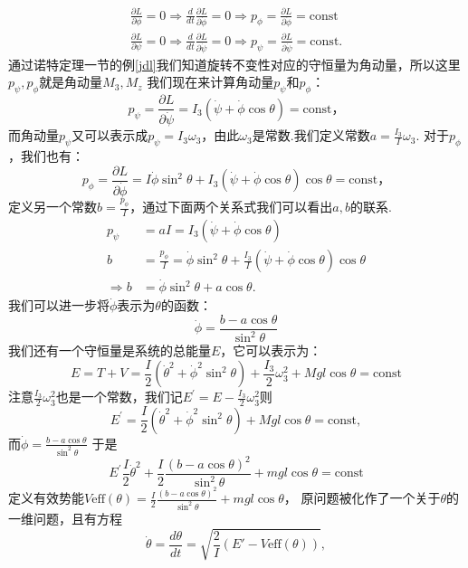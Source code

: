\documentclass[UTF8,10.5pt,a4paper]{ctexart}
\numberwithin{equation}{section}
\theoremstyle{definition}
\theoremstyle{definition}
\begin{document}
 \begin{align*}
 \frac{\partial L}{\partial \phi} = 0 \Rightarrow
 \frac{d}{dt}\frac{\partial L}{\partial \dot{\phi}} = 0 \Rightarrow
 p_{\phi} = \frac{\partial L}{\partial \dot{\phi}} = \text{const}\\
  \frac{\partial L}{\partial \psi} = 0 \Rightarrow
 \frac{d}{dt}\frac{\partial L}{\partial \dot{\psi}} = 0 \Rightarrow
 p_{\psi} = \frac{\partial L}{\partial \dot{\psi}} = \text{const}.
 \end{align*}
 通过诺特定理一节的例\ref{jdl}我们知道旋转不变性对应的守恒量为角动量，所以这里$p_{\psi},p_{\phi}$就是角动量$M_3,M_z$
 我们现在来计算角动量$p_{\psi}$和$p_{\phi}$：
$$p_{\psi} = \frac{\partial L}{\partial \dot{\psi}} = I_{3}\left(\dot{\psi} + \dot{\phi}\cos \theta \right) = \text{const} \text{，}$$
而角动量$p_{\psi}$又可以表示成$p_{\psi}=I_3\omega_3$，由此$\omega_3$是常数.我们定义常数$a = \frac{I_{3}}{I}\omega_{3}$.
对于$p_{\phi}$，我们也有：
$$p_{\phi} = \frac{\partial L}{\partial \dot{\phi}} =I\dot{\phi}\sin^{2}\theta + I_{3}\left( \dot{\psi}+\dot{\phi}\cos\theta\right)\cos\theta =\text{const} \text{，}$$
定义另一个常数$b = \frac{p_{\phi}}{I}$，通过下面两个关系式我们可以看出$a,b$的联系.
\begin{align*}
p_{\psi} &= aI = I_{3}\left( \dot{\psi} + \dot{\phi}\cos\theta
\right)\\
    b &= \frac{p_{\phi}}{I} = \dot{\phi}\sin^{2}\theta +
\frac{I_{3}}{I}\left( \dot{\psi} + \dot{\phi}\cos\theta
\right)\cos\theta\\
\Rightarrow b&= \dot{\phi}\sin^{2}\theta + a\cos \theta .
\end{align*}
我们可以进一步将$\dot{\phi}$表示为$\theta$的函数：
$$\dot{\phi}=\frac{b - a\cos \theta}{\sin^{2}\theta}$$
我们还有一个守恒量是系统的总能量$E$，它可以表示为：
$$E = T+ V = \frac{I}{2}\left( \dot{\theta}^{2} +\dot{\phi}^{2}\sin^{2}\theta \right) + \frac{I_{3}}{2}\omega_{3}^{2}+ Mgl\cos\theta = \text{const} $$
注意$\frac{I_{3}}{2}\omega_{3}^{2}$也是一个常数，我们记$E^{\prime}=E-\frac{I_{3}}{2}\omega_{3}^{2}$则
$$E^{\prime}=\frac{I}{2}\left( \dot{\theta}^{2} +\dot{\phi}^{2}\sin^{2}\theta \right)+ Mgl\cos\theta = \text{const} ,$$
而$\dot{\phi}=\frac{b - a\cos \theta}{\sin^{2}\theta}$
于是
$$E^{\prime}\frac{I}{2}\dot{\theta}^{2} +\frac{I}{2}\frac{\left( b - a\cos \theta \right)^{2}}{\sin^{2}\theta}+mgl\cos\theta = \text{const}$$
定义有效势能$V\text{eff}(\theta) = \frac{I}{2}\frac{\left( b - a\cos \theta \right)^{2}}{\sin^{2}\theta}+mgl\cos\theta $，
原问题被化作了一个关于$\theta$的一维问题，且有方程
$$\dot{\theta} = \frac{d\theta}{dt} = \sqrt{\frac{2}{I}\left( E' -V\text{eff}(\theta) \right)},$$
\end{document}

